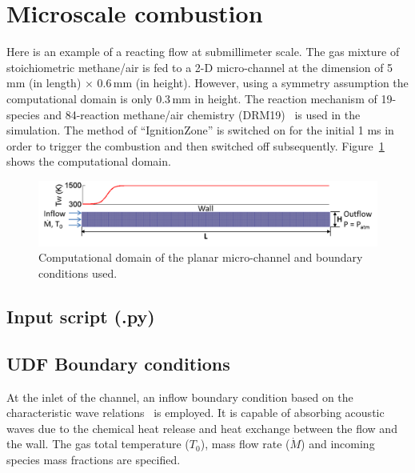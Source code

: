 
\section{Microscale combustion}
\label{micro-combustion}
%
Here is an example of a reacting flow at submillimeter scale.
The gas mixture of
stoichiometric methane/air is fed to a 2-D micro-channel at the dimension of 5\,mm
(in length) $\times$ 0.6\,mm (in height).
However, using a symmetry assumption
the computational domain is only 0.3\,mm in height.
The reaction mechanism of 19-species and
84-reaction methane/air chemistry (DRM19)~\cite{DRM19} is used in the simulation.
The method of ``IgnitionZone'' is switched on for the initial 1 ms in order to
trigger the combustion and then switched off subsequently. Figure~\ref{fig:micro-combustion-domain}
shows the computational domain.

\begin{figure}[h]
\begin{center}
\includegraphics[width=15cm]{../2D/micro-combustion/computational_domain.png}
\caption{Computational domain of the planar micro-channel and boundary conditions used.}
\label{fig:micro-combustion-domain}
\end{center}
\end{figure}

\subsection{Input script (.py)}
%
\noindent\topbar

\bottombar

\subsection{UDF Boundary conditions}
%
At the inlet of the channel, an inflow boundary condition based on the characteristic
wave relations~\cite{Poi_JCP_1992} is employed. It is capable of absorbing acoustic waves
due to the chemical heat release and heat exchange between the flow and the wall. 
The gas total temperature ($T_0$), mass flow rate ($\dot{M}$) and incoming species
mass fractions are specified.\\
\noindent\topbar

\bottombar

